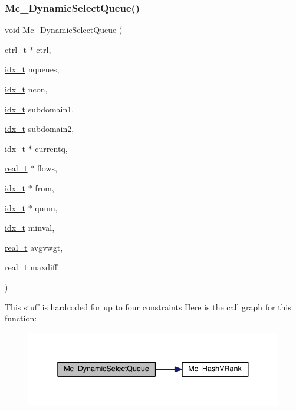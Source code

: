 \subsubsection{\texorpdfstring{Mc\+\_\+\+Dynamic\+Select\+Queue()}{Mc\_DynamicSelectQueue()}}
{\footnotesize\ttfamily void Mc\+\_\+\+Dynamic\+Select\+Queue (\begin{DoxyParamCaption}\item[{\hyperlink{a00742}{ctrl\+\_\+t} $\ast$}]{ctrl,  }\item[{\hyperlink{a00876_aaa5262be3e700770163401acb0150f52}{idx\+\_\+t}}]{nqueues,  }\item[{\hyperlink{a00876_aaa5262be3e700770163401acb0150f52}{idx\+\_\+t}}]{ncon,  }\item[{\hyperlink{a00876_aaa5262be3e700770163401acb0150f52}{idx\+\_\+t}}]{subdomain1,  }\item[{\hyperlink{a00876_aaa5262be3e700770163401acb0150f52}{idx\+\_\+t}}]{subdomain2,  }\item[{\hyperlink{a00876_aaa5262be3e700770163401acb0150f52}{idx\+\_\+t} $\ast$}]{currentq,  }\item[{\hyperlink{a00876_a1924a4f6907cc3833213aba1f07fcbe9}{real\+\_\+t} $\ast$}]{flows,  }\item[{\hyperlink{a00876_aaa5262be3e700770163401acb0150f52}{idx\+\_\+t} $\ast$}]{from,  }\item[{\hyperlink{a00876_aaa5262be3e700770163401acb0150f52}{idx\+\_\+t} $\ast$}]{qnum,  }\item[{\hyperlink{a00876_aaa5262be3e700770163401acb0150f52}{idx\+\_\+t}}]{minval,  }\item[{\hyperlink{a00876_a1924a4f6907cc3833213aba1f07fcbe9}{real\+\_\+t}}]{avgvwgt,  }\item[{\hyperlink{a00876_a1924a4f6907cc3833213aba1f07fcbe9}{real\+\_\+t}}]{maxdiff }\end{DoxyParamCaption})}

This stuff is hardcoded for up to four constraints Here is the call graph for this function\+:\nopagebreak
\begin{figure}[H]
\begin{center}
\leavevmode
\includegraphics[width=338pt]{a00404_aeeb2d9296e2305bdf67b62ba868ad55b_cgraph}
\end{center}
\end{figure}
\mbox{\label{a00404_a626dd91f1c7a272128a4e825fa72cf18}} 
